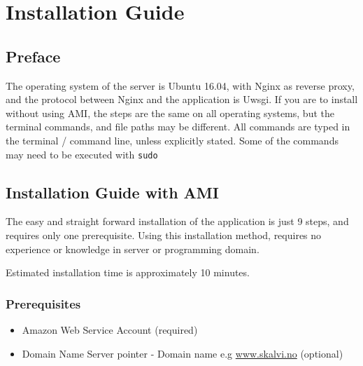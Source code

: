 


\chapter{Installation Guide}
\label{Installation Guide}

\section{Preface}
The operating system of the server is Ubuntu 16.04, with Nginx as reverse proxy, and the protocol between Nginx and the application is Uwsgi. If you are to install without using AMI, the steps are the same on all operating systems, but the terminal commands, and file paths may be different.
All commands are typed in the terminal / command line, unless explicitly stated. Some of the commands may need to be executed with \verb!sudo!

\section{Installation Guide with AMI}
The easy and straight forward installation of the application is just 9 steps, and requires only one prerequisite. Using this installation method, requires no experience or knowledge in server or programming domain. 

Estimated installation time is approximately 10 minutes.

\subsection{Prerequisites}
\begin{itemize}  
\item Amazon Web Service Account (required)
\item Domain Name Server pointer - Domain name e.g \url{www.skalvi.no} (optional)
\end{itemize}


